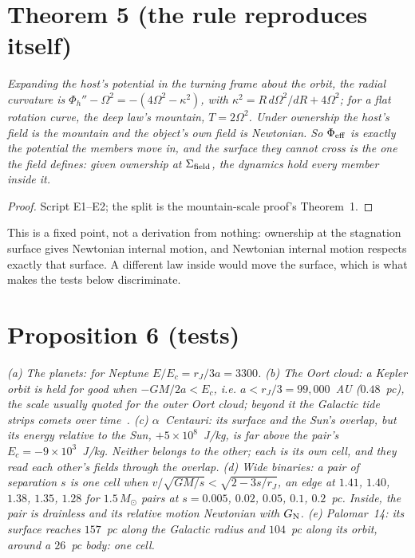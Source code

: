 \documentclass[twocolumn]{iopjournal}
\begin{document}

\section*{Theorem 5 (the rule reproduces itself)}

\emph{Expanding the host's potential in the turning frame about the
orbit, the radial curvature is $\Phi_h'' - \Omega^2 = -(4\Omega^2 -
\kappa^2)$, with $\kappa^2 = R\,d\Omega^2/dR + 4\Omega^2$; for a flat
rotation curve, the deep law's mountain, $T = 2\Omega^2$. Under
ownership the host's field is the mountain and the object's own field is
Newtonian. So $\Phi_{\rm eff}$ is exactly the potential the members move
in, and the surface they cannot cross is the one the field defines:
given ownership at $\Sigma_{\rm field}$, the dynamics hold every member
inside it.}

\begin{proof}
Script E1--E2; the split is the mountain-scale proof's Theorem~1.
\end{proof}

This is a fixed point, not a derivation from nothing: ownership at the
stagnation surface gives Newtonian internal motion, and Newtonian
internal motion respects exactly that surface. A different law inside
would move the surface, which is what makes the tests below
discriminate.


\section*{Proposition 6 (tests)}

\emph{(a) The planets: for Neptune $E/E_c = r_J/3a = 3300$. (b) The
Oort cloud: a Kepler orbit is held for good when $-GM/2a < E_c$, i.e.
$a < r_J/3 = 99{,}000$~AU ($0.48$~pc), the scale usually quoted for the
outer Oort cloud; beyond it the Galactic tide strips comets over
time~\cite{Heisler1986}. (c) $\alpha$~Centauri: its surface and the
Sun's overlap, but its energy relative to the Sun, $+5\times10^8$~J/kg,
is far above the pair's $E_c = -9\times10^3$~J/kg. Neither belongs to
the other; each is its own cell, and they read each other's fields
through the overlap. (d) Wide binaries: a pair of separation $s$ is one
cell when $v/\sqrt{GM/s} < \sqrt{2 - 3s/r_J}$, an edge at $1.41$,
$1.40$, $1.38$, $1.35$, $1.28$ for $1.5\,M_\odot$ pairs at $s = 0.005$,
$0.02$, $0.05$, $0.1$, $0.2$~pc. Inside, the pair is drainless and its
relative motion Newtonian with $G_{\rm N}$. (e) Palomar~14: its surface
reaches $157$~pc along the Galactic radius and $104$~pc along its orbit,
around a $26$~pc body: one cell.}
\end{document}
